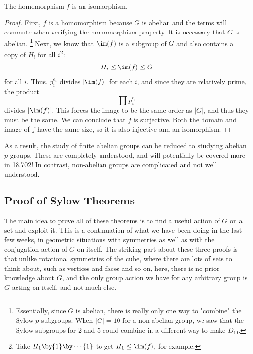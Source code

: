 \begin{lemma}
    The homomorphism $f$ is an isomorphism.
\end{lemma}


\begin{proof}
    First, $f$ is a homomorphism because $G$ is abelian and the terms will commute when verifying the homomorphism property. It is necessary that $G$ is abelian. \footnote{Essentially, since $G$ is abelian, there is really only one way to "combine" the Sylow $p$-subgroups. When $|G| = 10$ for a non-abelian group, we saw that the Sylow subgroups for 2 and 5 could combine in a different way to make $D_{10}.$} Next, we know that $\im(f)$ is a subgroup of $G$ and also contains a copy of $H_i$ for all $i$\footnote{Take $H_1 \by \{1\} \by \cdots \{1\}$ to get $H_1 \leq \im(f),$ for example.}: \[H_i \leq \im(f) \leq G\] for all $i.$
    Thus, $p_i^{e_i}$ divides $\lvert\im(f)\rvert$ for each $i$, and since they are relatively prime, the product 
    \[\prod p_i^{e_i}\] divides $\lvert\im(f)\rvert.$ This forces the image to be the same order as $|G|$, and thus they must be the same. We can conclude that $f$ is surjective. Both the domain and image of $f$ have the same size, so it is also injective and an isomorphism.
\end{proof}

As a result, the study of finite abelian groups can be reduced to studying abelian $p$-groups. These are completely understood, and will potentially be covered more in 18.702! In contrast, non-abelian groups are complicated and not well understood.

\subsection{Proof of Sylow Theorems}
The main idea to prove all of these theorems is to find a useful action of $G$ on a set and exploit it. This is a continuation of what we have been doing in the last few weeks, in geometric situations with symmetries as well as with the conjugation action of $G$ on itself. The striking part about these three proofs is that unlike rotational symmetries of the cube, where there are lots of sets to think about, such as vertices and faces and so on, here, there is no prior knowledge about $G$, and the only group action we have for any arbitrary group is $G$ acting on itself, and not much else. 

